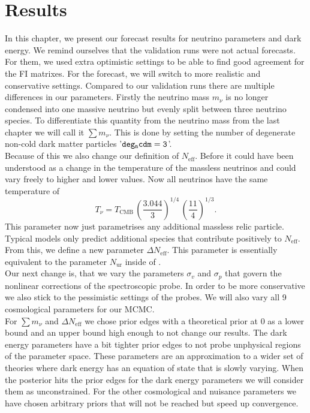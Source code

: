 \documentclass[../main.tex]{subfiles}
\begin{document}
\chapter{Results}
In this chapter, we present our forecast results for neutrino parameters and dark energy. We remind ourselves that the validation runs were not actual forecasts. For them, we used extra optimistic settings to be able to find good agreement for the FI matrixes. For the forecast, we will switch to more realistic and conservative settings. Compared to our validation runs there are multiple differences in our parameters. Firstly the neutrino mass $m_\nu$ is no longer condensed into one massive neutrino but evenly split between three neutrino species. To differentiate this quantity from the neutrino mass from the last chapter we will call it $\sum m_\nu$. This is done by setting the number of degenerate non-cold dark matter particles '${\tt deg_ncdm=3}$'.\\
Because of this we also change our definition of $N_\mathrm{eff}$. Before it could have been understood as a change in the temperature of the massless neutrinos and could vary freely to higher and lower values. Now all neutrinos have the same temperature of \begin{equation}
    T_{\nu} = T_\mathrm{CMB}\,\left(\frac{3.044}{3}\right)^{1/4}\,\left(\frac{11}{4}\right)^{1/3}.
\end{equation}
This parameter now just parametrises any additional massless relic particle. Typical models only predict additional species that contribute positively to $N_\mathrm{eff}$. From this, we define a new parameter $\Delta N_\mathrm{eff}$. This parameter is essentially equivalent to the parameter $N_\mathrm{ur}$ inside of \class.\\
Our next change is, that we vary the parameters $\sigma_v$ and $\sigma_p$ that govern the nonlinear corrections of the spectroscopic probe. In order to be more conservative we also stick to the pessimistic settings of the probes. We will also vary all 9 cosmological parameters for our MCMC.\\
For $\sum m_\nu$ and $\Delta N_\mathrm{eff}$ we chose prior edges with a theoretical prior at 0 as a lower bound and an upper bound high enough to not change our results. The dark energy parameters have a bit tighter prior edges to not probe unphysical regions of the parameter space. These parameters are an approximation to a wider set of theories where dark energy has an equation of state that is slowly varying. When the posterior hits the prior edges for the dark energy parameters we will consider them as unconstrained. For the other cosmological and nuisance parameters we have chosen arbitrary priors that will not be reached but speed up convergence.\\
\end{document}
